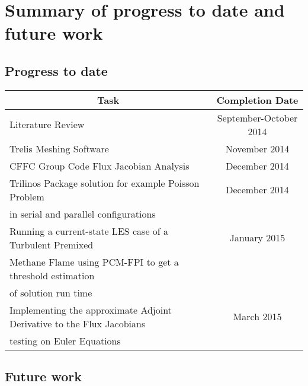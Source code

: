 \section{Summary of progress to date and future work}

\subsection{Progress to date}

\begin{tabular}{|l|c|} \hline
\multicolumn{1}{|c|}{\bf{Task}} & \multicolumn{1}{|c|}{\bf{Completion Date}} \\

\hline Literature Review & September-October 2014 \\

\hline Trelis Meshing Software & November 2014 \\

\hline CFFC Group Code Flux Jacobian Analysis & December 2014 \\

\hline Trilinos Package solution for example Poisson Problem & December 2014 \\in serial and parallel configurations & \\

\hline Running a current-state LES case of a Turbulent Premixed & January 2015 \\Methane Flame using PCM-FPI to get a threshold estimation & \\ of solution run time &\\

\hline Implementing the approximate Adjoint Derivative to the Flux Jacobians & March 2015 \\ testing on Euler Equations  &\\

\hline
\end{tabular}

\subsection{Future work}

